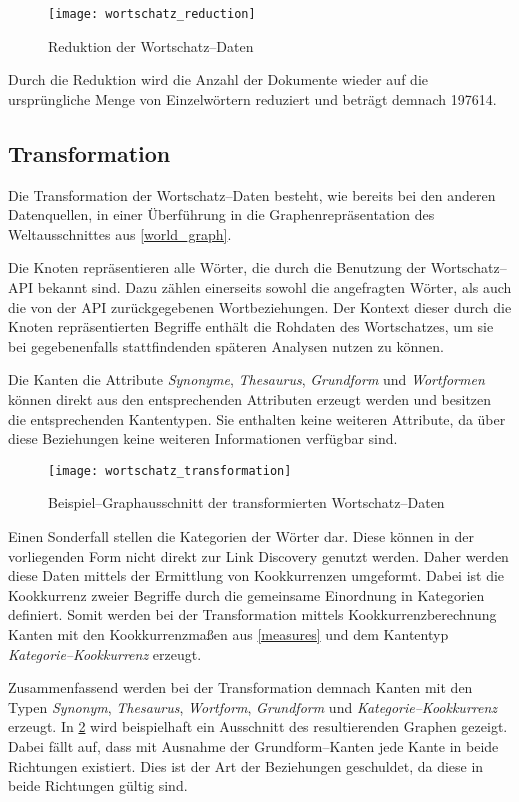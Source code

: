 \begin{figure}
\centering
\texttt{[image: wortschatz\_reduction]}
\caption{Reduktion der Wortschatz--Daten}
\label{fig:wortschatz_reduction}
\end{figure}

Durch die Reduktion wird die Anzahl der Dokumente wieder auf die ursprüngliche Menge von Einzelwörtern reduziert und beträgt demnach \num{197614}.

\subsection{Transformation}

Die Transformation der Wortschatz--Daten besteht, wie bereits bei den anderen Datenquellen, in einer Überführung in die Graphenrepräsentation des Weltausschnittes aus \cref{world_graph}. 

Die Knoten repräsentieren alle Wörter, die durch die Benutzung der Wortschatz--API bekannt sind. Dazu zählen einerseits sowohl die angefragten Wörter, als auch die von der API zurückgegebenen Wortbeziehungen. Der Kontext dieser durch die Knoten repräsentierten Begriffe enthält die Rohdaten des Wortschatzes, um sie bei gegebenenfalls stattfindenden späteren Analysen nutzen zu können.

Die Kanten die Attribute \emph{Synonyme}, \emph{Thesaurus}, \emph{Grundform} und \emph{Wortformen} können direkt aus den entsprechenden Attributen erzeugt werden und besitzen die entsprechenden Kantentypen. Sie enthalten keine weiteren Attribute, da über diese Beziehungen keine weiteren Informationen verfügbar sind.

\begin{figure}
\centering
\texttt{[image: wortschatz\_transformation]}
\caption{Beispiel--Graphausschnitt der transformierten Wortschatz--Daten}
\label{fig:wortschatz_transformation}
\end{figure}

Einen Sonderfall stellen die Kategorien der Wörter dar. Diese können in der vorliegenden Form nicht direkt zur Link Discovery genutzt werden. Daher werden diese Daten mittels der Ermittlung von Kookkurrenzen umgeformt. Dabei ist die Kookkurrenz zweier Begriffe durch die gemeinsame Einordnung in Kategorien definiert. Somit werden bei der Transformation mittels Kookkurrenzberechnung Kanten mit den Kookkurrenzmaßen aus \cref{measures} und dem Kantentyp \emph{Kategorie--Kookkurrenz} erzeugt.

Zusammenfassend werden bei der Transformation demnach Kanten mit den Typen \emph{Synonym}, \emph{Thesaurus}, \emph{Wortform}, \emph{Grundform} und \emph{Kategorie--Kookkurrenz} erzeugt. In \cref{fig:wortschatz_transformation} wird beispielhaft ein Ausschnitt des resultierenden Graphen gezeigt. Dabei fällt auf, dass mit Ausnahme der Grundform--Kanten jede Kante in beide Richtungen existiert. Dies ist der Art der Beziehungen geschuldet, da diese in beide Richtungen gültig sind.

